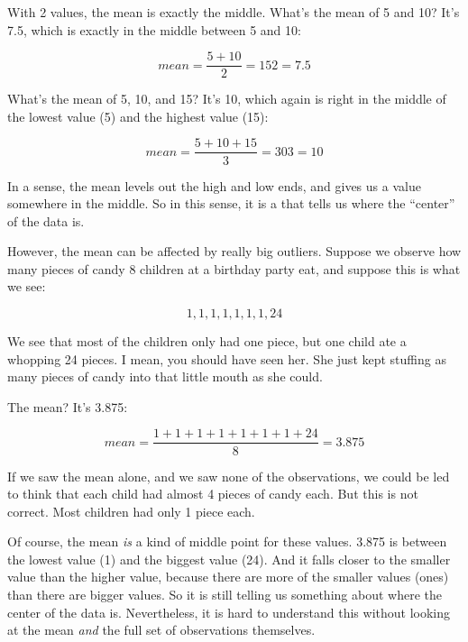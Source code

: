 \documentclass[../../../main.tex]{subfiles}
\begin{document}
With 2 values, the mean is exactly the middle. What's the mean of 5 and 10? It's 7.5, which is exactly in the middle between 5 and 10:

\begin{equation*}
  mean = \frac{5 + 10}{2} = {15}{2} = 7.5
\end{equation*}

\noindent
What's the mean of 5, 10, and 15? It's 10, which again is right in the middle of the lowest value (5) and the highest value (15):

\begin{equation*}
  mean = \frac{5 + 10 + 15}{3} = {30}{3} = 10
\end{equation*}

\noindent
In a sense, the mean levels out the high and low ends, and gives us a value somewhere in the middle. So in this sense, it is a  that tells us where the ``center'' of the data is.

However, the mean can be affected by really big outliers. Suppose we observe how many pieces of candy 8 children at a birthday party eat, and suppose this is what we see:

\begin{equation*}
  1, 1, 1, 1, 1, 1, 1, 24
\end{equation*}

\noindent
We see that most of the children only had one piece, but one child ate a whopping 24 pieces. I mean, you should have seen her. She just kept stuffing as many pieces of candy into that little mouth as she could.

The mean? It's 3.875:

\begin{equation*}
  mean = \frac{1 + 1 + 1 + 1 + 1 + 1 + 1 + 24}{8} = 3.875
\end{equation*}

\noindent
If we saw the mean alone, and we saw none of the observations, we could be led to think that each child had almost 4 pieces of candy each. But this is not correct. Most children had only 1 piece each.

Of course, the mean \emph{is} a kind of middle point for these values. 3.875 is between the lowest value (1) and the biggest value (24). And it falls closer to the smaller value than the higher value, because there are more of the smaller values (ones) than there are bigger values. So it is still telling us something about where the center of the data is. Nevertheless, it is hard to understand this without looking at the mean \emph{and} the full set of observations themselves.
\end{document}
